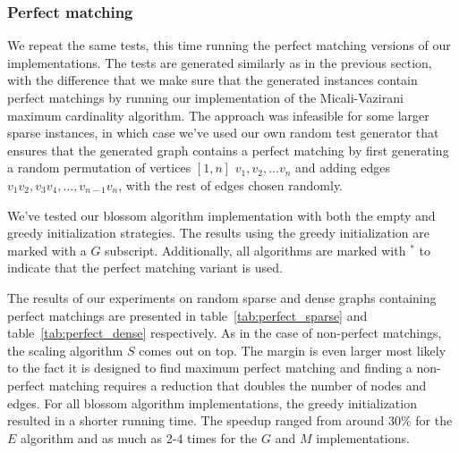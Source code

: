 \subsubsection*{Perfect matching}

We repeat the same tests, this time running the perfect matching versions of our implementations. The tests are generated similarly as in the previous section, with the difference that we make sure that the generated instances contain perfect matchings by running our implementation of the Micali-Vazirani maximum cardinality algorithm. The approach was infeasible for some larger sparse instances, in which case we've used our own random test generator that ensures that the generated graph contains a perfect matching by first generating a random permutation of vertices $[1, n]$ $v_1, v_2, \dots v_n$ and adding edges $v_1v_2, v_3v_4, \dots, v_{n-1}v_n$, with the rest of edges chosen randomly.

We've tested our blossom algorithm implementation with both the empty and greedy initialization strategies. The results using the greedy initialization are marked with a $G$ subscript. Additionally, all algorithms are marked with $^*$ to indicate that the perfect matching variant is used.

The results of our experiments on random sparse and dense graphs containing perfect matchings are presented in table~\ref{tab:perfect_sparse} and table~\ref{tab:perfect_dense} respectively. As in the case of non-perfect matchings, the scaling algorithm $S$ comes out on top. The margin is even larger most likely to the fact it is designed to find maximum perfect matching and finding a non-perfect matching requires a reduction that doubles the number of nodes and edges. For all blossom algorithm implementations, the greedy initialization resulted in a shorter running time. The speedup ranged from around $30\%$ for the $E$ algorithm and as much as 2-4 times for the $G$ and $M$ implementations.

